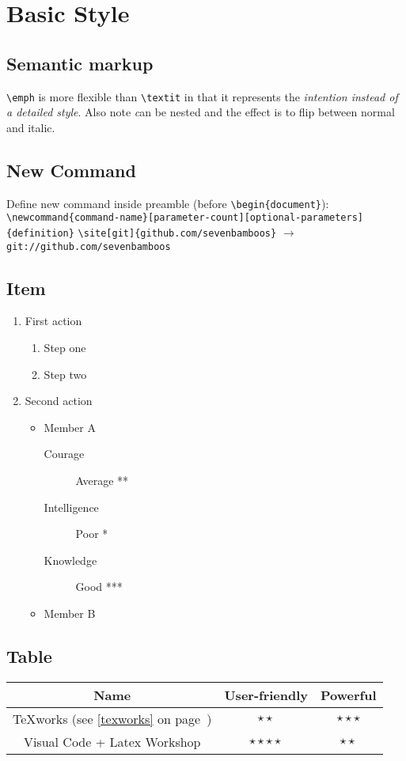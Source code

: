 \documentclass{article}
\newcommand{\site}[2][protocol]{\texttt{#1://#2}}
\newcommand{\fullref}[1]{\ref{#1} on page~\pageref{#1}}
\begin{document}
\section{Basic Style}
\subsection{Semantic markup}

\verb|\emph| is more flexible than \verb|\textit| in that it represents the \emph{\emph{intention} instead of a detailed style}.
Also note \emph can be nested and the effect is to flip between normal and italic.

\subsection{New Command}
Define new command inside preamble (before \verb|\begin{document}|):
\\ \verb|\newcommand{command-name}[parameter-count][optional-parameters]{definition}|
\verb|\site[git]{github.com/sevenbamboos}| $\rightarrow$ \site[git]{github.com/sevenbamboos}

\subsection{Item}
\begin{enumerate}
  \item First action
  \begin{enumerate}
    \item Step one
    \item Step two
  \end{enumerate}
  \item Second action
  \begin{itemize}
    \item Member A
    \begin{description}
      \item[Courage] Average **
      \item[Intelligence] Poor *
      \item[Knowledge] Good ***
    \end{description}
    \item Member B
  \end{itemize}
\end{enumerate}

\subsection{Table}
\begin{tabular}{ccc}
  Name & User-friendly & Powerful\\
  \hline
  TeXworks (see \fullref{texworks}) & $\star\star$ & $\star\star\star$\\
  Visual Code + Latex Workshop & $\star\star\star\star$ & $\star\star$\\
\end{tabular}
\end{document}
